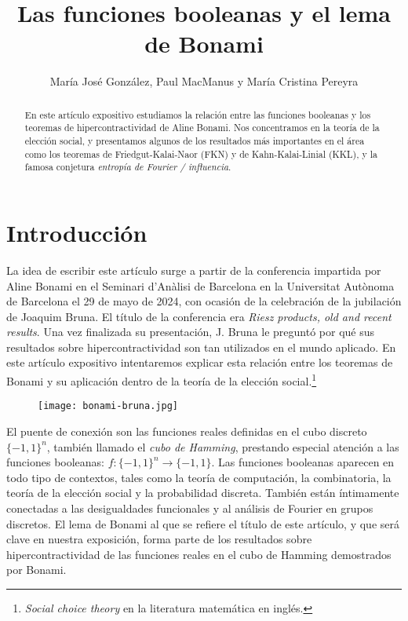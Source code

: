 \documentclass[autocontact]{gaceta}
\title{Las funciones booleanas y el lema de Bonami}
\author{María José González, Paul MacManus y María Cristina Pereyra} %
\begin{document}

\maketitle

\begin{abstract}
En este artículo expositivo estudiamos la relación entre las funciones booleanas y los teoremas de hipercontractividad de Aline Bonami. Nos concentramos en la teoría de la elección social, y presentamos algunos de los resultados más importantes en el área como los teoremas de Friedgut-Kalai-Naor (FKN) y de Kahn-Kalai-Linial (KKL), y la famosa conjetura \emph{entropía de Fourier / influencia}.
\end{abstract}


\section{Introducción}

La idea de escribir este artículo surge a partir de la conferencia impartida por Aline Bonami en el Seminari d’Anàlisi de Barcelona en la Universitat Autònoma de Barcelona el 29 de mayo de 2024, con ocasión de la celebración de la jubilación de Joaquim Bruna. El título de la conferencia era \emph{Riesz products, old and recent results}. Una vez finalizada su presentación, J. Bruna le preguntó por qué sus resultados sobre hipercontractividad son tan utilizados en el mundo aplicado. En este artículo expositivo intentaremos explicar esta
relación entre los teoremas de Bonami y su aplicación dentro de la teoría de la elección social.\footnote{\emph{Social choice theory} en la literatura matemática en inglés.}

\begin{figure}
   \centering
   \texttt{[image: bonami-bruna.jpg]}
\end{figure}

El puente de conexión son las funciones reales definidas en el cubo discreto $\{-1,1\}^n$, también llamado el \emph{cubo de Hamming}, prestando especial atención a las funciones booleanas: $f:\{-1,1\}^n\to\{-1,1\}$. Las funciones booleanas aparecen en todo tipo de contextos, tales como la teoría de computación, la combinatoria, la teoría de la elección social y la probabilidad discreta. También están íntimamente conectadas a las desigualdades funcionales y al análisis de Fourier en grupos discretos. El lema de Bonami al que se refiere el título de este artículo, y que será clave en nuestra exposición, forma parte de los resultados sobre hipercontractividad de las funciones reales en el cubo de Hamming demostrados por Bonami.
\end{document}
